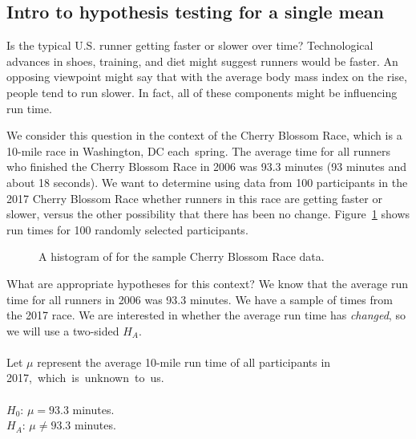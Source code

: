 \subsection{Intro to hypothesis testing for a single mean}

\newcommand{\cherryblossomn}{100}
\newcommand{\cherryblossommean}{97.3}
\newcommand{\cherryblossomnull}{93.3}
\newcommand{\cherryblossomsd}{17.0}
\newcommand{\cherryblossomse}{1.7}
\newcommand{\cherryblossomt}{2.35}

Is the typical U.S. runner getting faster or slower over time? Technological advances in shoes, training, and diet might suggest runners would be faster. An opposing viewpoint might say that with the average body mass index on the rise, people tend to run slower. In fact, all of these components might be influencing run time.

We consider this question in the context of the Cherry Blossom Race, which is a 10-mile race in Washington, DC each~spring.  The average time for all runners who finished the Cherry Blossom Race in 2006 was \cherryblossomnull{} minutes (93 minutes and about 18 seconds). We want to determine using data from \cherryblossomn{} participants in the 2017 Cherry Blossom Race whether runners in this race are getting faster or slower, versus the other possibility that there has been no change.   Figure~\ref{run17SampTimeHistogram} shows run times for \cherryblossomn{} randomly selected participants.  

\begin{figure}[h]
\centering
\caption{A histogram of  for the sample Cherry Blossom Race data.}
\label{run17SampTimeHistogram}
\end{figure}


\begin{examplewrap}
\begin{nexample}
{What are appropriate hypotheses for this context?}
We know that the average run time for all runners in 2006 was \cherryblossomnull{} minutes.  We have a sample of times from the 2017 race.  We are interested in whether the average run time has \emph{changed}, so we will use a two-sided $H_A$.\\
\\
Let $\mu$ represent the average 10-mile run time of all participants in 2017,\mbox{ which is unknown to us.}
\\
\\
$H_0$: $\mu = \cherryblossomnull{}$ minutes.
\\$H_A$: $\mu \neq \cherryblossomnull{}$ minutes. 
\end{nexample}
\end{examplewrap}

